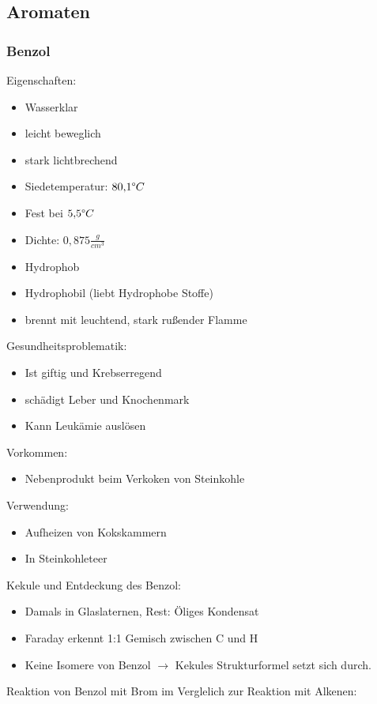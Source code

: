 \documentclass[a4paper, 12pt]{scrartcl}
\begin{document}
\subsection{Aromaten}
\subsubsection{Benzol}
Eigenschaften:
\begin{itemize}
    \item Wasserklar
    \item leicht beweglich
    \item stark lichtbrechend
    \item Siedetemperatur: $80{,}1\degree C$
    \item Fest bei $5{,}5\degree C$
    \item Dichte: $0{,}875 \frac{g}{cm^{3}}$
    \item Hydrophob
    \item Hydrophobil (liebt Hydrophobe Stoffe)
    \item brennt mit leuchtend, stark rußender Flamme
\end{itemize}
%
Gesundheitsproblematik: 
\begin{itemize}
    \item Ist giftig und Krebserregend
    \item schädigt Leber und Knochenmark
    \item Kann Leukämie auslösen
\end{itemize}
%
Vorkommen:
\begin{itemize}
    \item Nebenprodukt beim Verkoken von Steinkohle
\end{itemize}
%
Verwendung:
\begin{itemize}
    \item Aufheizen von Kokskammern
    \item In Steinkohleteer
\end{itemize}
%
Kekule und Entdeckung des Benzol:
\begin{itemize}
    \item Damals in Glaslaternen, Rest: Öliges Kondensat
    \item Faraday erkennt 1:1 Gemisch zwischen C und H
    \item Keine Isomere von Benzol $ \rightarrow$ Kekules Strukturformel setzt
        sich durch.
\end{itemize}
%
Reaktion von Benzol mit Brom im Verglelich zur Reaktion mit Alkenen:
\end{document}
